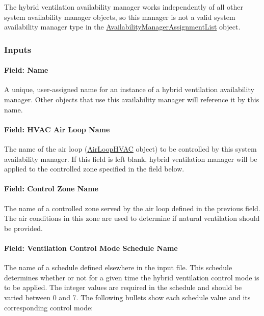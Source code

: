 The hybrid ventilation availability manager works independently of all other system availability manager objects, so this manager is not a valid system availability manager type in the \hyperref[availabilitymanagerassignmentlist]{AvailabilityManagerAssignmentList} object.

\subsubsection{Inputs}\label{inputs-10-021}

\paragraph{Field: Name}\label{field-name-9-018}

A unique, user-assigned name for an instance of a hybrid ventilation availability manager. Other objects that use this availability manager will reference it by this name.

\paragraph{Field: HVAC Air Loop Name}\label{field-hvac-air-loop-name-000}

The name of the air loop (\hyperref[airloophvac]{AirLoopHVAC} object) to be controlled by this system availability manager. If this field is left blank, hybrid ventilation manager will be applied to the controlled zone specified in the field below.

\paragraph{Field: Control Zone Name}\label{field-controlled-zone-name}

The name of a controlled zone served by the air loop defined in the previous field. The air conditions in this zone are used to determine if natural ventilation should be provided.

\paragraph{Field: Ventilation Control Mode Schedule Name}\label{field-ventilation-control-mode-schedule-name}

The name of a schedule defined elsewhere in the input file. This schedule determines whether or not for a given time the hybrid ventilation control mode is to be applied. The integer values are required in the schedule and should be varied between 0 and 7. The following bullets show each schedule value and its corresponding control mode:

